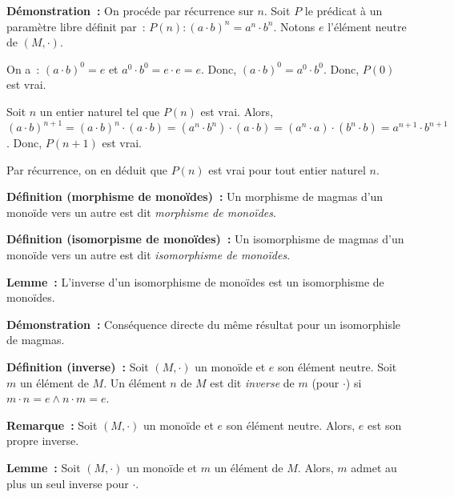 \medskip

\noindent\textbf{Démonstration :} On procéde par récurrence sur $n$.
    Soit $P$ le prédicat à un paramètre libre définit par : $P(n): (a \cdot b)^n = a^n \cdot b^n$.
    Notons $e$ l'élément neutre de $(M, \cdot)$.

    On a : $(a \cdot b)^0 = e$ et $a^0 \cdot b^0 = e \cdot e = e$.
    Donc, $(a \cdot b)^0 = a^0 \cdot b^0$.
    Donc, $P(0)$ est vrai.

    Soit $n$ un entier naturel tel que $P(n)$ est vrai. 
    Alors, $(a \cdot b)^{n+1} = (a \cdot b)^n \cdot (a \cdot b) = (a^n \cdot b^n) \cdot (a \cdot b) = (a^n \cdot a) \cdot (b^n \cdot b) = a^{n+1} \cdot b^{n+1}$.
    Donc, $P(n+1)$ est vrai.

    Par récurrence, on en déduit que $P(n)$ est vrai pour tout entier naturel $n$.

    \done

\medskip

\noindent\textbf{Définition (morphisme de monoïdes) :} Un morphisme de magmas d'un monoïde vers un autre est dit \textit{morphisme de monoïdes}.

\medskip

\noindent\textbf{Définition (isomorpisme de monoïdes) :} Un isomorphisme de magmas d'un monoïde vers un autre est dit \textit{isomorphisme de monoïdes}.

\medskip

\noindent\textbf{Lemme :} L'inverse d'un isomorphisme de monoïdes est un isomorphisme de monoïdes.

\medskip

\noindent\textbf{Démonstration :} Conséquence directe du même résultat pour un isomorphisle de magmas.

\medskip

\noindent\textbf{Définition (inverse) :} Soit $(M,\cdot)$ un monoïde et $e$ son élément neutre. 
    Soit $m$ un élément de $M$. 
    Un élément $n$ de $M$ est dit \textit{inverse} de $m$ (pour $\cdot$) si $m \cdot n = e \wedge  n \cdot m = e$.

\medskip

\noindent\textbf{Remarque :} Soit $(M,\cdot)$ un monoïde et $e$ son élément neutre.
    Alors, $e$ est son propre inverse.
    
\medskip

\noindent\textbf{Lemme :} Soit $(M,\cdot)$ un monoïde et $m$ un élément de $M$.
    Alors, $m$ admet au plus un seul inverse pour $\cdot$.

\medskip

